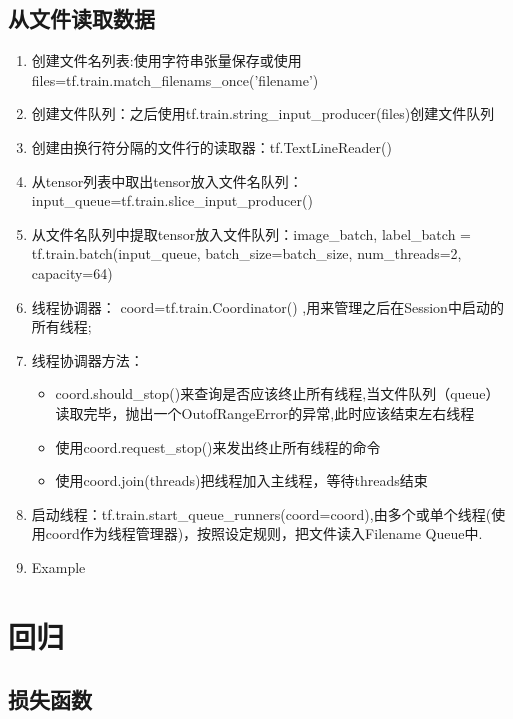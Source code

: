 \documentclass[UTF8]{article}%
\begin{document}
		\subsection{从文件读取数据}
			\flushleft
			\begin{enumerate}
				\item 创建文件名列表:使用字符串张量保存或使用files=tf.train.match\_filenams\_once('filename')
				\item 创建文件队列：之后使用tf.train.string\_input\_producer(files)创建文件队列
				\item 创建由换行符分隔的文件行的读取器：tf.TextLineReader()
				\item 从tensor列表中取出tensor放入文件名队列：input\_queue=tf.train.slice\_input\_producer()
				\item 从文件名队列中提取tensor放入文件队列：image\_batch, label\_batch = tf.train.batch(input\_queue, batch\_size=batch\_size, num\_threads=2, capacity=64)
				\item 线程协调器： coord=tf.train.Coordinator() ,用来管理之后在Session中启动的所有线程;
				\item 线程协调器方法：
				\begin{itemize}
					\item coord.should\_stop()来查询是否应该终止所有线程,当文件队列（queue）读取完毕，抛出一个OutofRangeError的异常,此时应该结束左右线程
					\item 使用coord.request\_stop()来发出终止所有线程的命令
					\item 使用coord.join(threads)把线程加入主线程，等待threads结束\textbf{}
				\end{itemize}
				\item 启动线程：tf.train.start\_queue\_runners(coord=coord),由多个或单个线程(使用coord作为线程管理器)，按照设定规则，把文件读入Filename Queue中.
				\item Example
			\end{enumerate}

	
	\section{回归}
		\subsection{损失函数}
\end{document}
